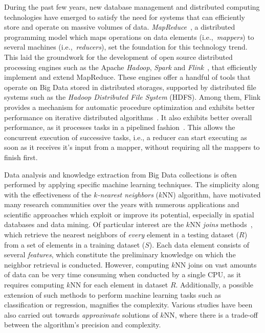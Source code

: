 During the past few years, new database management and distributed computing technologies have emerged to satisfy the need for systems that can efficiently store and operate on massive volumes of data. \textit{MapReduce}~\cite{dean2008msd}, a distributed programming model which maps operations on data elements (i.e.,~\textit{mappers}) to several machines (i.e.,~\textit{reducers}), set the foundation for this technology trend. This laid the groundwork for the development of open source distributed processing engines such as the Apache \textit{Hadoop}, \textit{Spark} and \textit{Flink}~\cite{alexandrov2014stratosphere}, that efficiently implement and extend MapReduce. These engines offer a handful of tools that operate on Big Data stored in distributed storages, supported by distributed file systems such as the \textit{Hadoop Distributed File System} (HDFS). Among them, Flink provides a mechanism for automatic procedure optimization and exhibits better performance on iterative distributed algorithms~\cite{studybig2014}. It also exhibits better overall performance, as it processes tasks in a pipelined fashion~\cite{flinkPipeline}. This allows the concurrent execution of successive tasks, i.e., a reducer can start executing as soon as it receives it's input from a mapper, without requiring all the mappers to finish first.

Data analysis and knowledge extraction from Big Data collections is often performed by applying specific machine learning techniques. The simplicity along with the effectiveness of the \textit{$k$-nearest neighbors} ($k$NN) algorithm, have motivated many research communities over the years with numerous applications and scientific approaches which exploit or improve its potential, especially in spatial databases and data mining. Of particular interest are the $k$NN \textit{joins} methods~\cite{bohm2004knn}, which retrieve the nearest neighbors of \textit{every} element in a testing dataset ($R$) from a set of elements in a training dataset ($S$). Each data element consists of several \textit{features}, which constitute the preliminary knowledge on which the neighbor retrieval is conducted. However, computing $k$NN joins on vast amounts of data can be very time consuming when conducted by a single CPU, as it requires computing $k$NN for each element in dataset $R$. Additionally, a possible extension of such methods to perform machine learning tasks such as classification or regression, magnifies the complexity. Various studies have been also carried out towards \textit{approximate} solutions of $k$NN, where there is a trade-off between the algorithm's precision and complexity. 

